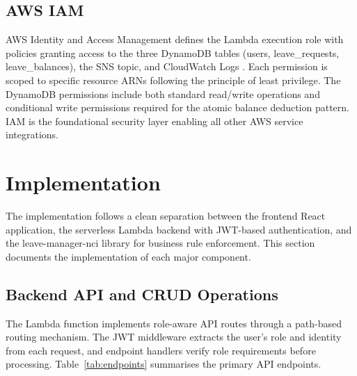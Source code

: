 \documentclass[conference]{IEEEtran}
\begin{document}
\subsection{AWS IAM}

AWS Identity and Access Management defines the Lambda execution role with policies granting access to the three DynamoDB tables (users, leave\_requests, leave\_balances), the SNS topic, and CloudWatch Logs \cite{awsiam}. Each permission is scoped to specific resource ARNs following the principle of least privilege. The DynamoDB permissions include both standard read/write operations and conditional write permissions required for the atomic balance deduction pattern. IAM is the foundational security layer enabling all other AWS service integrations.

\section{Implementation}

The implementation follows a clean separation between the frontend React application, the serverless Lambda backend with JWT-based authentication, and the leave-manager-nci library for business rule enforcement. This section documents the implementation of each major component.

\subsection{Backend API and CRUD Operations}

The Lambda function implements role-aware API routes through a path-based routing mechanism. The JWT middleware extracts the user's role and identity from each request, and endpoint handlers verify role requirements before processing. Table~\ref{tab:endpoints} summarises the primary API endpoints.
\end{document}
